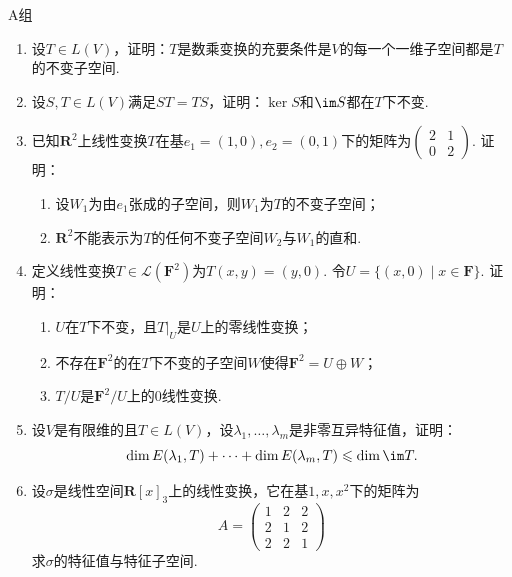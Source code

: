 \centerline{\heiti A组}
\begin{enumerate}
    \item 设$T\in L(V)$，证明：$T$是数乘变换的充要条件是$V$的每一个一维子空间都是$T$的不变子空间.

    \item 设$S,T\in L(V)$满足$ST=TS$，证明：$\ker S$和$\im S$都在$T$下不变.

    \item 已知$\mathbf{R}^2$上线性变换$T$在基$e_1=(1,0),e_2=(0,1)$下的矩阵为$\begin{pmatrix}2 & 1 \\ 0 & 2\end{pmatrix}$. 证明：
          \begin{enumerate}
              \item 设$W_1$为由$e_1$张成的子空间，则$W_1$为$T$的不变子空间；

              \item $\mathbf{R}^2$不能表示为$T$的任何不变子空间$W_2$与$W_1$的直和.
          \end{enumerate}

    \item 定义线性变换$T\in \mathcal{L}(\mathbf{F}^2)$为$T(x,y)=(y,0)$. 令$U=\{(x,0) \mid x\in\mathbf{F}\}$. 证明：
          \begin{enumerate}
              \item $U$在$T$下不变，且$T|_{U}$是$U$上的零线性变换；

              \item 不存在$\mathbf{F}^2$的在$T$下不变的子空间$W$使得$\mathbf{F}^2=U\oplus W$；

              \item $T/U$是$\mathbf{F}^2/U$上的0线性变换.
          \end{enumerate}

    \item 设$V$是有限维的且$T\in L(V)$，设$\lambda_1,\ldots,\lambda_m$是非零互异特征值，证明：
          \[ \dim E(\lambda_1,T)+\cdots+\dim E(\lambda_m,T)\leqslant\dim\im T. \]

    \item 设$\sigma$是线性空间$\mathbf{R}[x]_3$上的线性变换，它在基$1,x,x^2$下的矩阵为
          \[ A=\begin{pmatrix}
                  1 & 2 & 2 \\ 2 & 1 & 2 \\ 2 & 2 & 1
              \end{pmatrix}\]
          求$\sigma$的特征值与特征子空间.


\end{enumerate}
